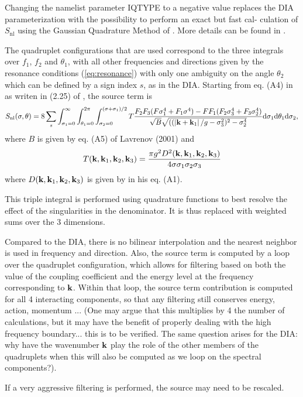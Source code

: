 
\noindent
Changing the namelist parameter IQTYPE to a negative value replaces the
DIA parameterization with the possibility to perform an exact but fast cal-
culation of $S_{\mathrm{nl}}$ using the Gaussian Quadrature Method of \cite{Lavrenov2001}.
More details can be found in \cite{Gagnaire-Renou2009}.


The quadruplet configurations that are used correspond to the three integrals over $f_1$, $f_2$ and $\theta_1$, with all other frequencies and directions given by the resonance conditions (\ref{eq:resonance}) with only one ambiguity on the angle $\theta_2$ which can be defined by a sign index $s$, as in the DIA.  Starting from eq. (A4) in \cite{Lavrenov2001} as writen in (2.25) of \cite{Gagnaire-Renou2009}, the source term is 
\begin{equation}
S_{\mathrm{nl}}(\sigma,\theta) =  8 \sum_s \int_{\sigma_1=0}^\infty \int_{\theta_1=0}^{2 \pi} \int_{\sigma_2=0}^{(\sigma+\sigma_1)/2}  T  \frac{F_2 F_3 (F \sigma_1^4 + F_1 \sigma^4) - F F_1 (F_2 \sigma_3^4 + F_3 \sigma_2^4)}{\sqrt{B}\sqrt{((\left| \mbox{\bf k}+\mbox{\bf k}_1 \right|/g- \sigma_3^2)^2-\sigma_2^4} } {\mathrm d}\sigma_1 {\mathrm d}\theta_1 {\mathrm d}\sigma_2 ,
      \label{eq:snl_gqm}
\end{equation}
where $B$ is given by eq. (A5) of Lavrenov (2001) and  
\begin{equation}
T(\mbox{\bf k},\mbox{\bf k}_1,\mbox{\bf k}_2,\mbox{\bf k}_3) = \frac{\pi g^2 D^2(\mbox{\bf k},\mbox{\bf k}_1,\mbox{\bf k}_2,\mbox{\bf k}_3) }{4 \sigma \sigma_1 \sigma_2 \sigma_3}
\end{equation}
where $ D(\mbox{\bf k},\mbox{\bf k}_1,\mbox{\bf k}_2,\mbox{\bf k}_3)$ is given by \cite{Webb1978} in his eq. (A1). 

This triple integral is performed using quadrature functions to best resolve the effect of the singularities in the denominator. It is thus replaced with weighted sums over the 3 dimensions. 

Compared to the DIA, there is no bilinear interpolation and the nearest neighbor is used in frequency and direction. Also, 
the source term is computed by a loop over the quadruplet configuration, which allows for filtering based on 
both the value of the coupling coefficient and the energy level at the frequency corresponding to $\mbox{\bf k}$. Within 
that loop, the source term contribution is computed for all 4 interacting components, so that any filtering still 
conserves energy, action, momentum ... (One may argue that this multiplies by 4 the number of calculations, but it may have the benefit of properly dealing with the high frequency boundary... this is to be verified. The same question arises for the DIA: why have the wavenumber $\mbox{\bf k}$ play the role of the other members of the quadruplets when this will also be computed as we loop on the spectral components?). 

If a very aggressive filtering is performed, the source may need to be rescaled.


